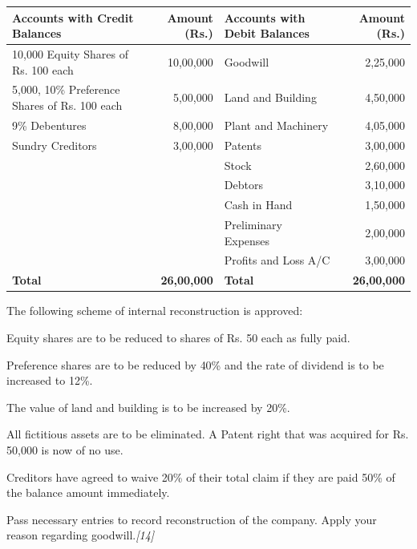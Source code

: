 \documentclass[11pt,a4paper]{article}
\newcommand{\pts}[1]{\hfill   \textit{[#1]}}
\begin{document}
\begin{center}
  
\begin{tabular}{|p{4.3cm}|r|p{4.3cm}|r|}
    \hline
   \textbf{Accounts with Credit Balances} &   \textbf{Amount (Rs.)} &   \textbf{Accounts with Debit Balances} &   \textbf{Amount (Rs.)} \\ \hline
    \raggedright 10,000 Equity Shares of Rs. 100 each & 10,00,000 & \raggedright Goodwill & 2,25,000 \\
    \raggedright 5,000, 10\% Preference Shares of Rs. 100 each & 5,00,000 & \raggedright Land and Building & 4,50,000 \\
    \raggedright 9\% Debentures & 8,00,000 & \raggedright Plant and Machinery & 4,05,000 \\
    \raggedright Sundry Creditors & 3,00,000 & \raggedright Patents & 3,00,000 \\
    & & \raggedright Stock & 2,60,000 \\
    & & \raggedright Debtors & 3,10,000 \\
    & & \raggedright Cash in Hand & 1,50,000 \\
    & & \raggedright Preliminary Expenses & 2,00,000 \\
    & & \raggedright Profits and Loss A/C & 3,00,000 \\ \hline
   \textbf{Total} &   \textbf{26,00,000} &   \textbf{Total} &   \textbf{26,00,000} \\ \hline
  \end{tabular}
\end{center}
The following scheme of internal reconstruction is approved:

\begin{parts}
  \item Equity shares are to be reduced to shares of Rs. 50 each as fully paid.
  \item Preference shares are to be reduced by 40\% and the rate of dividend is to be increased to 12\%.
  \item The value of land and building is to be increased by 20\%.
  \item All fictitious assets are to be eliminated. A Patent right that was acquired for Rs. 50,000 is now of no use.
  \item Creditors have agreed to waive 20\% of their total claim if they are paid 50\% of the balance amount immediately.
\end{parts}
Pass necessary entries to record reconstruction of the company. Apply your reason regarding goodwill.\pts{14}
\end{document}
